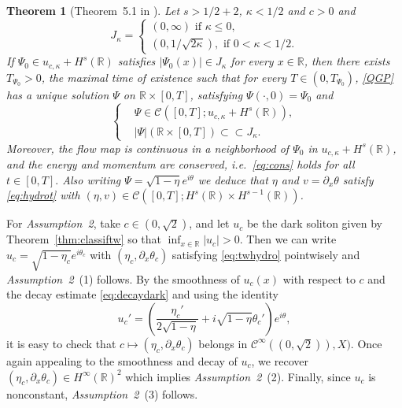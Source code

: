 \documentclass[11pt]{article}
\newcommand{\R}{\mathbb{R}}
\newcommand{\boC}{\mathcal{C}}
\theoremstyle{plain}
\newtheorem{theorem}{Theorem}[section]
\theoremstyle{definition}
\theoremstyle{remark}
\numberwithin{equation}{section}
\begin{document}
{	\begin{theorem}[Theorem~5.1 in \cite{benzoniLWP}]\label{thm:lwpEK}
		Let $s>1/2+2$, $\kappa<1/2$ and $c>0$ and \begin{equation*}
			J_\kappa=\begin{cases}
				(0,\infty)\text{ if }\kappa\leq0,\\
				(0,1/\sqrt{2\kappa}),\text{ if }0<\kappa<1/2.
			\end{cases}
		\end{equation*}
		If $\Psi_0\in u_{c,\kappa}+ H^{s}(\R)$ satisfies $|\Psi_0(x)|\in J_\kappa$ for every $x\in\R$,
		then there exists $T_{\Psi_0}>0$, the maximal time of existence such that for every $T\in (0,T_{\Psi_0})$, \eqref{QGP} has a unique solution $\Psi$ on  $\R\times[0,T]$, satisfying $\Psi(\cdot,0)=\Psi_0$ and 
		\begin{equation*}\label{lwp}
			\left\{ \begin{aligned}
				&\Psi\in\boC([0,T];u_{c,\kappa}+ H^{s}(\R)),\\
				&|\Psi|(\R\times[0,T])\subset\subset J_\kappa.
			\end{aligned}\right.
		\end{equation*}
		Moreover, the flow map is continuous in a neighborhood of $\Psi_0$ in $u_{c,\kappa}+ H^{s}(\R)$, and the energy and momentum are conserved, i.e.\ \eqref{eq:cons} holds for all $t\in[0,T].$
		Also writing $\Psi=\sqrt{1-\eta}e^{i\theta}$ we deduce that $\eta$ and $v=\partial_{x}\theta$ satisfy \eqref{eq:hydrot} with $(\eta,v)\in\boC([0,T]; H^{s}(\R)\times H^{{s-1}}(\R))$.
	\end{theorem}
	For \textit{Assumption~2}, take $c\in(0,\sqrt2)$, and let $u_{c}$ be the dark soliton given by Theorem~\ref{thm:classiftw} so that $\inf_{x\in\R}|u_c|>0$. Then we can write $u_c=\sqrt{1-\eta_c}e^{i\theta_c}$ with $(\eta_c,\partial_x\theta_c)$ satisfying \eqref{eq:twhydro} pointwisely and \textit{Assumption~2}~(1) follows. By the smoothness of $u_c(x)$ with respect to $c$ and the decay estimate \eqref{eq:decaydark} and using the identity 
	\begin{equation}\label{eq:polarder}
		u_c'=\left(\frac{\eta_c'}{2\sqrt{1-\eta}}+i\sqrt{1-\eta}\theta_c'\right)e^{i\theta},
	\end{equation} it is easy to check that $c\mapsto(\eta_c,\partial_x\theta_c)$ belongs in $\boC^\infty((0,\sqrt2)),X)$. Once again appealing to the smoothness and decay of $u_c$, we recover $(\eta_c,\partial_x\theta_c)\in  H^\infty(\R)^2$ which implies \textit{Assumption~2}~(2). 
	Finally, since $u_c$ is nonconstant, \textit{Assumption~2}~(3) follows.
	
}
\end{document}
